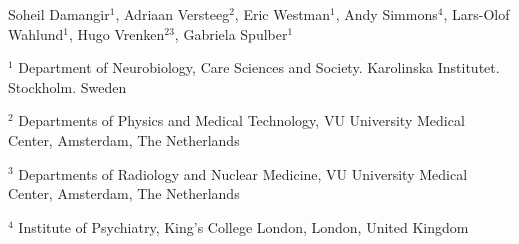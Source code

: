Soheil Damangir$^1$, 
Adriaan Versteeg$^2$, 
Eric Westman$^1$, 
Andy Simmons$^4$, 
Lars-Olof Wahlund$^1$, 
Hugo Vrenken$^{23}$, 
Gabriela Spulber$^1$

$^1$ Department of Neurobiology, Care Sciences and Society. Karolinska Institutet. Stockholm. Sweden

$^2$ Departments of Physics and Medical Technology, VU University Medical Center, Amsterdam, The Netherlands

$^3$ Departments of Radiology and Nuclear Medicine, VU University Medical Center, Amsterdam, The Netherlands

$^4$ Institute of Psychiatry, King's College London, London, United Kingdom
  
  
  
  
  